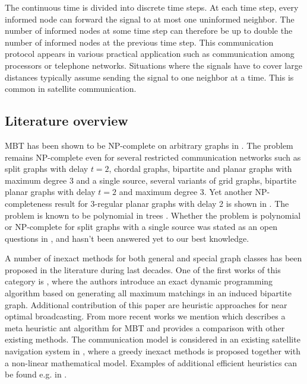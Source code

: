 The continuous time is divided into discrete time steps.
At each time step, every informed node can forward the signal to at most one uninformed neighbor.
The number of informed nodes at some time step can therefore be up to double the number of informed nodes at the previous time step.
This communication protocol appears in various practical application such as communication among processors or telephone networks.
Situations where the signals have to cover large distances typically assume sending the signal to one neighbor at a time.
This is common in satellite communication.

\subsection{Literature overview}

MBT has been shown to be NP-complete on arbitrary graphs in \cite{slater81}. 
The problem remains NP-complete even for several restricted communication networks \cite{jansen95} such as
split graphs with delay $t=2$, chordal graphs,
bipartite and planar graphs with maximum degree 3 and a single source,
several variants of grid graphs,
bipartite planar graphs with delay $t=2$ and maximum degree 3. 
Yet another NP-completeness result for 3-regular planar graphs with delay 2 is shown in \cite{middendorf93}.
The problem is known to be polynomial in trees \cite{slater81}.
Whether the problem is polynomial or NP-complete for split graphs with a single source was stated as an open questions in \cite{jansen95}, and hasn't been answered yet to our best knowledge.

A number of inexact methods for both general and special graph classes has been proposed in the literature during last decades.
One of the first works of this category is \cite{scheuermann84}, 
where the authors introduce an exact dynamic programming algorithm based on generating all maximum matchings in an induced bipartite graph.
Additional contribution of this paper are heuristic approaches for near optimal broadcasting.
From more recent works we mention \cite{hasson04} which describes a meta heuristic ant algorithm for MBT and provides a comparison with other existing methods.
The communication model is considered in an existing satellite navigation system in \cite{chu17}, where a greedy inexact methods is proposed together with a non-linear mathematical model.
Examples of additional efficient heuristics can be found e.g. in \cite{harutyunyan06,harutyunyan14,wang10,jimborean13}.

